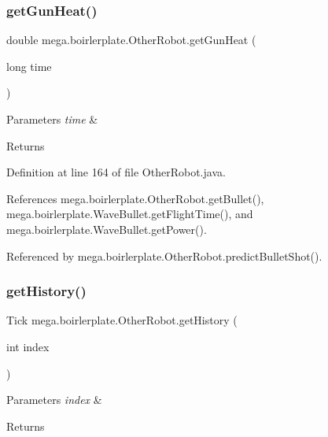 \subsubsection{\texorpdfstring{get\+Gun\+Heat()}{getGunHeat()}}
{\footnotesize\ttfamily double mega.\+boirlerplate.\+Other\+Robot.\+get\+Gun\+Heat (\begin{DoxyParamCaption}\item[{long}]{time }\end{DoxyParamCaption})}


\begin{DoxyParams}{Parameters}
{\em time} & \\
\hline
\end{DoxyParams}
\begin{DoxyReturn}{Returns}

\end{DoxyReturn}


Definition at line 164 of file Other\+Robot.\+java.



References mega.\+boirlerplate.\+Other\+Robot.\+get\+Bullet(), mega.\+boirlerplate.\+Wave\+Bullet.\+get\+Flight\+Time(), and mega.\+boirlerplate.\+Wave\+Bullet.\+get\+Power().



Referenced by mega.\+boirlerplate.\+Other\+Robot.\+predict\+Bullet\+Shot().

\mbox{\label{classmega_1_1boirlerplate_1_1_other_robot_ab1926ef85af1666797e0236ef9a9ca71}} 
\subsubsection{\texorpdfstring{get\+History()}{getHistory()}}
{\footnotesize\ttfamily Tick mega.\+boirlerplate.\+Other\+Robot.\+get\+History (\begin{DoxyParamCaption}\item[{int}]{index }\end{DoxyParamCaption})}


\begin{DoxyParams}{Parameters}
{\em index} & \\
\hline
\end{DoxyParams}
\begin{DoxyReturn}{Returns}

\end{DoxyReturn}


